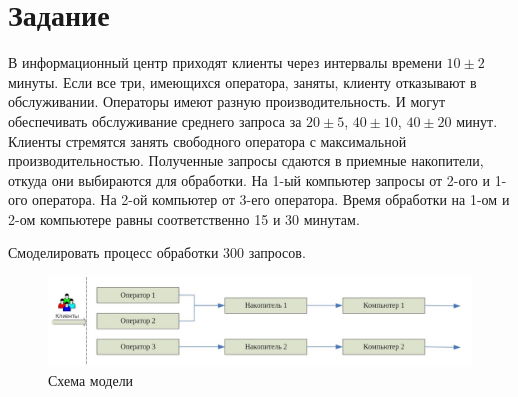 \chapter*{Задание}

В информационный центр приходят клиенты через интервалы времени $10\pm2$ минуты. Если все три, имеющихся оператора, заняты, клиенту отказывают в обслуживании. Операторы имеют разную производительность. И могут обеспечивать обслуживание среднего запроса за $20\pm5$, $40\pm10$, $40\pm20$ минут. Клиенты стремятся занять свободного оператора с максимальной производительностью. Полученные запросы сдаются в приемные накопители, откуда они выбираются для обработки. На 1-ый компьютер запросы от 2-ого и 1-ого оператора. На 2-ой компьютер от 3-его оператора. Время обработки на 1-ом и 2-ом компьютере равны соответственно 15 и 30 минутам.

Смоделировать процесс обработки 300 запросов.

\begin{figure}[h]
	\includegraphics[width=1\linewidth]{inc/img/schema1.jpg}
	\caption{Схема модели}
	\label{s1}
\end{figure}